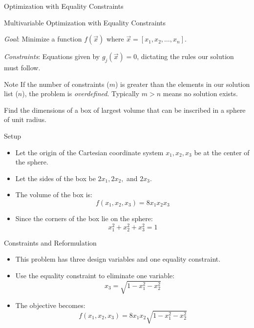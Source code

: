 \documentclass[
    NAME={Dr. Helga Ingimundardóttir},
    EMAIL={helgaingim@hi.is},
    FACULTY={Industrial Engineering},
    TITLE={Local and Global Optimization},
    SUBTITLE={Understanding Optima in Complex Landscapes},
    SEMINAR={VÉL113F},
    DATE={Design and Optimization},
    WIDE=true
]{../HI-latex/hi-beamer}
\begin{document}
    \begin{frame}{Optimization with Equality Constraints}
        \begin{block}{Multivariable Optimization with Equality Constraints}

            \emph{Goal}: Minimize a function \(f(\vec{x})\) where \(\vec{x} = [x_1, x_2, \dots, x_n]\).

            \emph{Constraints}: Equations given by \(g_j(\vec{x}) = 0\), dictating the rules our solution must
            follow.

        \end{block}

        \begin{alert}{Note}
            If the number of constraints (\(m\)) is greater than the elements in our solution list (\(n\)), the
            problem is \emph{overdefined}. Typically $m > n$ means no solution exists.
        \end{alert}

        \framebreak
        \begin{example}
            Find the dimensions of a box of largest volume that can be inscribed in a sphere of unit radius.
        \end{example}

        \alert{Setup}
        \begin{itemize}
            \item Let the origin of the Cartesian coordinate system \(x_1, x_2, x_3\) be at the center of the sphere.
            \item Let the sides of the box be \(2x_1, 2x_2,\) and \(2x_3\).
            \item The volume of the box is:
            \[f(x_1, x_2, x_3) = 8x_1 x_2 x_3\]
            \item Since the corners of the box lie on the sphere:
            \[x_1^2 + x_2^2 + x_3^2 = 1\]
        \end{itemize}

        \alert{Constraints and Reformulation}
        \begin{itemize}
            \item This problem has three design variables and one equality constraint.
            \item Use the equality constraint to eliminate one variable:
            \[x_3 = \sqrt{1 - x_1^2 - x_2^2}\]
            \item The objective becomes:
            \[f(x_1, x_2, x_3) = 8x_1 x_2 \sqrt{1 - x_1^2 - x_2^2}\]
        \end{itemize}


\end{frame}
\end{document}
